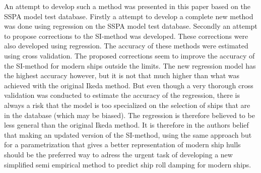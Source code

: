 An attempt to develop such a method was presented in this paper based on the SSPA model test database. Firstly a attempt to develop a complete new method was done using regression on the SSPA model test database. Secondly an attempt to propose corrections to the SI-method was developed. These corrections were also developed using regression. The accuracy of these methods were estimated using cross validation. The proposed corrections seem to improve the accuracy of the SI-method for modern ships outside the limits. The new regression model has the highest accuracy however, but it is not that much higher than what was achieved with the original Ikeda method. But even though a very thorough cross validation was conducted to estimate the accuracy of the regression, there is always a risk that the model is too specialized on the selection of ships that are in the database (which may be biased). The regression is therefore believed to be less general than the original Ikeda method. It is therefore in the authors belief that making an updated version of the SI-method, using the same approach but for a parametrization that gives a better representation of modern ship hulls should be the preferred way to adress the urgent task of developing a new simplified semi empirical method to predict ship roll damping for modern ships. 



